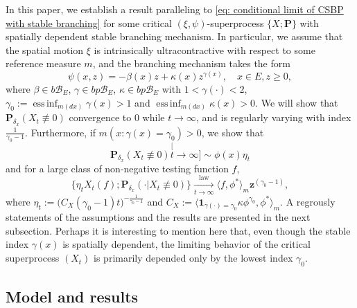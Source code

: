 \documentclass[12pt, a4paper]{amsart}
\theoremstyle{definition}
\numberwithin{equation}{section}
\begin{document}
	In this paper, we establish a result paralleling to \eqref{eq: conditional limit of CSBP with stable branching} for some critical $(\xi,\psi)$-superprocess $\{X; \mathbf P\}$ with spatially dependent stable branching mechanism.
	In particular, we assume that the spatial motion $\xi$ is intrinsically ultracontractive with respect to some reference measure $m$, and the branching mechanism takes the form 
\[
	\psi(x,z) = -\beta (x) z + \kappa(x) z^{\gamma(x)},
	\quad x\in E, z \geq 0,
\]
	where $\beta \in b\mathscr B_E$, $\gamma \in bp\mathscr B_E$, $\kappa \in bp\mathscr B_E$ with $1< \gamma(\cdot )<2$, $\gamma_0 := \operatorname{ess\,inf}_{m(dx)} \gamma(x)> 1$ and $\operatorname{ess\,inf}_{m(dx)}\kappa(x) > 0$. 
	We will show that $\mathbf P_{\delta_x}( X_t \not \equiv 0) $ convergence to $0$ while $t\to \infty$, and is regularly varying with index $\frac{1}{\gamma_0 - 1}$.
	Furthermore, if $m(x: \gamma(x) = \gamma_0)>0$, we show that 
\[
	\mathbf P_{\delta_x}( X_t \not \equiv 0) 
	\stackrel[t\to \infty]{}{\sim} \phi(x) \eta_t
\] 
	and for a large class of non-negative testing function $f$,
\[
	\{   \eta_t X_t(f) ; \mathbf P_{\delta_x}(\cdot | X_t \not \equiv 0) \}
	\xrightarrow[t\to \infty]{\operatorname{law}} 
	\langle f, \phi^*\rangle_m \mathbf z^{(\gamma_0 - 1)},
\] 
	where $\eta_t := \big( C_X(\gamma_0 - 1) t \big)^{- \frac {1} {\gamma_0 - 1} }$ and $C_X := \langle \mathbf 1_{\gamma(\cdot) = \gamma_0} \kappa \phi^{\gamma_0}, \phi^* \rangle_m$.
	A regrously statements of the assumptions and the results are presented in the next subsection.
	Perhaps it is interesting to mention here that, even though the stable index $\gamma(x)$ is spatially dependent, the limiting behavior of the critical superprocess $(X_t)$ is primarily depended only by the lowest index $\gamma_0$.
	
\subsection{Model and results}
\end{document}
